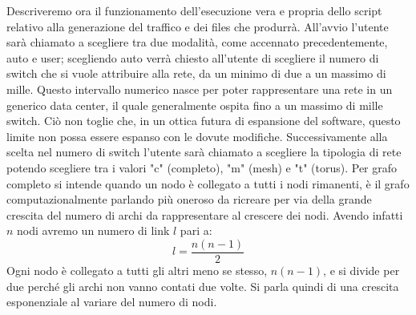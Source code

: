 \documentclass[binding=0.6cm]{sapthesis}
\begin{document}
Descriveremo ora il funzionamento dell'esecuzione vera e propria dello script relativo alla generazione del traffico e dei files che produrrà.
All'avvio l'utente sarà chiamato a scegliere tra due modalità, come accennato precedentemente, auto e user; scegliendo auto verrà chiesto all'utente
di scegliere il numero di switch che si vuole attribuire alla rete, da un minimo di due a un massimo di mille. Questo intervallo numerico nasce per
poter rappresentare una rete in un generico data center, il quale generalmente ospita fino a un massimo di mille switch. Ciò non toglie che,
in un ottica futura di espansione del software, questo limite non possa essere espanso con le dovute modifiche. Successivamente alla scelta nel numero
di switch l'utente sarà chiamato a scegliere la tipologia di rete potendo scegliere tra i valori "c" (completo), "m" (mesh) e "t" (torus). Per 
grafo completo
si intende quando un nodo è collegato a tutti i nodi rimanenti, è il grafo computazionalmente parlando più oneroso da ricreare per via 
della grande crescita
del numero di archi da rappresentare al crescere dei nodi. Avendo infatti \(n\) nodi avremo un numero di link \(l\) pari a:
\begin{equation}
    l = \frac{n(n-1)}{2}
    \label{eq:link_number}
\end{equation}
Ogni nodo è collegato a tutti gli altri meno se stesso, \(n(n-1)\), e si divide per due perché gli archi non vanno contati due volte. Si parla quindi di una crescita esponenziale al variare del numero di nodi.
\end{document}
